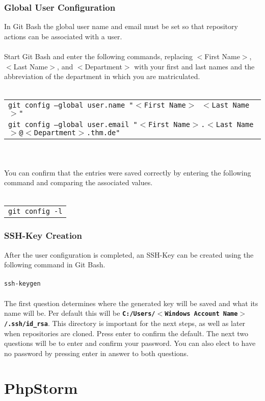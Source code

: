 \subsubsection{Global User Configuration}
In Git Bash the global user name and email must be set so that repository actions can be associated with a user.\\
\\
Start Git Bash and enter the following commands, replacing $<$First Name$>$, $<$Last Name$>$, and $<$Department$>$ with your first and last names and the abbreviation of the department in which you are matriculated.\\
\\
\begin{tabular}{l}
	\texttt{git config --global user.name "$<$First Name$>$ $<$Last Name$>$"}\\
	\texttt{git config --global user.email "$<$First Name$>$.$<$Last Name$>$@$<$Department$>$.thm.de"}\\
\end{tabular}\\
\\
You can confirm that the entries were saved correctly by entering the following command and comparing the associated values.\\
\\
\begin{tabular}{l}
	\texttt{git config -l}
\end{tabular}

\subsubsection{SSH-Key Creation}

After the user configuration is completed, an SSH-Key can be created using the following command in Git Bash.\\
\\ 
\texttt{ssh-keygen}\\
\\
The first question determines where the generated key will be saved and what its name will be. Per default this will be \textbf{\texttt{C:/Users/$<$Windows Account Name$>$/.ssh/id\_rsa}}. This directory is important for the next steps, as well as later when repositories are cloned. Press enter to confirm the default.
The next two questions will be to enter and confirm your password. You can also elect to have no password by pressing enter in answer to both questions.

\section{PhpStorm}
\label{sec:PHP-Storm}

